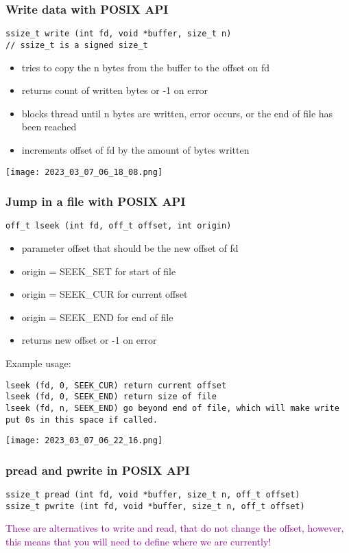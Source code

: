 \documentclass[main.tex,fontsize=8pt,paper=a4,paper=portrait,DIV=calc,]{scrartcl}
\begin{document}
\subsubsection{Write data with POSIX API}
\begin{lstlisting}
ssize_t write (int fd, void *buffer, size_t n)
// ssize_t is a signed size_t
\end{lstlisting}
\begin{itemize}
  \item tries to copy the n bytes from the buffer to the offset on fd 
\item returns count of written bytes or -1 on error
\item blocks thread until n bytes are written, error occurs, or the end of file has been reached
\item increments offset of fd by the amount of bytes written
\end{itemize} 
\texttt{[image: 2023\_03\_07\_06\_18\_08.png]}

\subsubsection{Jump in a file with POSIX API}
\begin{lstlisting}
off_t lseek (int fd, off_t offset, int origin)
\end{lstlisting}
\begin{itemize}
\item parameter offset that should be the new offset of fd
\item origin = SEEK\_SET for start of file
\item origin = SEEK\_CUR for current offset
\item origin = SEEK\_END for end of file
\item returns new offset or -1 on error
\end{itemize} 
Example usage:
\begin{lstlisting}
lseek (fd, 0, SEEK_CUR) return current offset
lseek (fd, 0, SEEK_END) return size of file
lseek (fd, n, SEEK_END) go beyond end of file, which will make write put 0s in this space if called. 
\end{lstlisting}
\texttt{[image: 2023\_03\_07\_06\_22\_16.png]}

\subsubsection{pread and pwrite in POSIX API}
\begin{lstlisting}
ssize_t pread (int fd, void *buffer, size_t n, off_t offset)
ssize_t pwrite (int fd, void *buffer, size_t n, off_t offset)
\end{lstlisting}
\textcolor{purple}{These are alternatives to write and read, that do not change the offset, however, this means that you will need to define where we are currently!}
\end{document}
